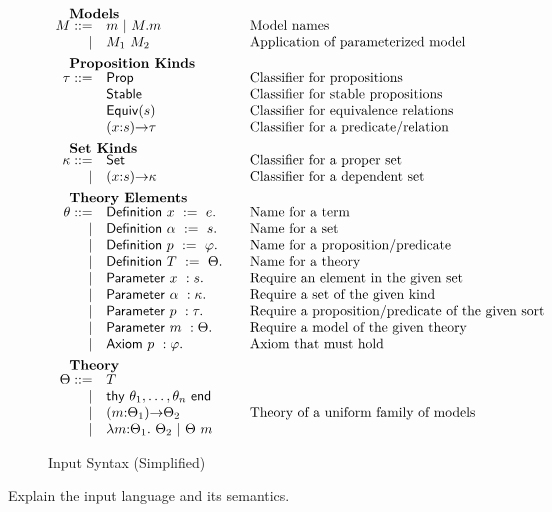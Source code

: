 \begin{figure}
\[\begin{array}{rl@{\qquad}l}
		\noalign{\textbf{Models}}		
		\im ::= 
		    & \iM \ |\ \iselect{\im}{\iM}&\mbox{Model names}\\
		  | & \iapp{\im_1}{\im_2}&\mbox{Application of parameterized model}\\[5pt]
		
		\noalign{\textbf{Proposition Kinds}}
		\ipt ::=
		    & \iProp & \mbox{Classifier for propositions}\\
		    & \iStable & \mbox{Classifier for stable propositions}\\
		    & \iEquiv{\is} &\mbox{Classifier for equivalence relations}\\
		    & \idarrow{\ix}{\is}{\ipt} & \mbox{Classifier for a predicate/relation}\\[5pt] 
		
		\noalign{\textbf{Set Kinds}}
		\ik ::= 
		    & \iSet &\mbox{Classifier for a proper set}\\
		   | & \idarrow{\ix}{\is}{\ik} &\mbox{Classifier for a dependent set}\\[5pt]
		

		\noalign{\textbf{Theory Elements}}
		\ite ::=
		     & \iDefinition{\ix}{\ie}&\mbox{Name for a term}\\
		   | & \iDefinition{\iS}{\is}&\mbox{Name for a set}\\
		   | & \iDefinition{\iP}{\ip}&\mbox{Name for a proposition/predicate}\\
		   | & \iDefinition{\iTH}{\ith}&\mbox{Name for a theory}\\
		   | & \iParameter{\ix}{\is}&\mbox{Require an element in the given set}\\
		   | & \iParameter{\iS}{\ik}&\mbox{Require a set of the given kind}\\
		   | & \iParameter{\iP}{\ipt}&\mbox{Require a proposition/predicate of the given sort}\\
		   | & \iParameter{\iM}{\ith}&\mbox{Require a model of the given theory}\\
		   | & \iAxiom{\iP}{\ip}&\mbox{Axiom that must hold}\\[5pt]

  		\noalign{\textbf{Theory}}
		\ith ::= 
		     & \iTH\\
		   	| & \ithy{\ite_1,\ldots,\ite_n}\\
		 	| & \idarrow{\iM}{\ith_1}{\ith_2} &\mbox{Theory of a uniform family of models}\\
		  	| & \ilambda{\iM}{\ith_1}{\ith_2}\ |\ 
		      \iapp{\ith}{\iM}\\
	\end{array}
	\]
	\label{fig:input}
	\caption{Input Syntax (Simplified)}
\end{figure}



Explain the input language and its semantics.





